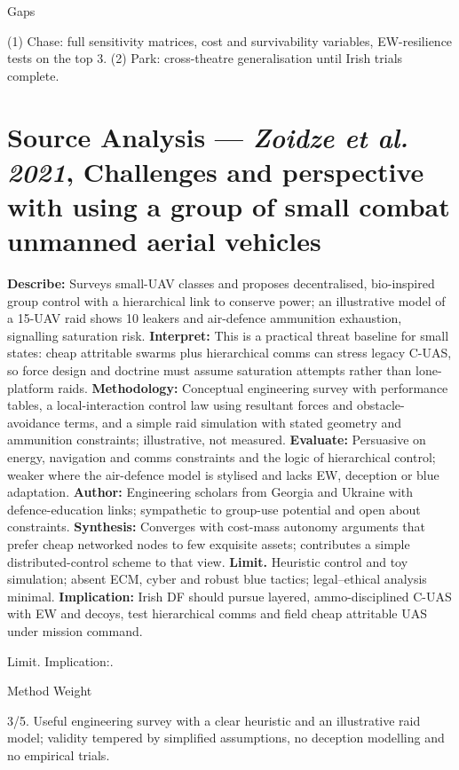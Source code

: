 Gaps

(1) Chase: full sensitivity matrices, cost and survivability variables, EW-resilience tests on the top 3.
(2) Park: cross-theatre generalisation until Irish trials complete.

\parencite{ZOIDZE_2021}

\section*{Source Analysis — \textit{Zoidze et al. 2021}, Challenges and perspective with using a group of small combat unmanned aerial vehicles}
\textbf{Describe:} Surveys small-UAV classes and proposes decentralised, bio-inspired group control with a hierarchical link to conserve power; an illustrative model of a 15-UAV raid shows 10 leakers and air-defence ammunition exhaustion, signalling saturation risk.
\textbf{Interpret:} This is a practical threat baseline for small states: cheap attritable swarms plus hierarchical comms can stress legacy C-UAS, so force design and doctrine must assume saturation attempts rather than lone-platform raids.
\textbf{Methodology:} Conceptual engineering survey with performance tables, a local-interaction control law using resultant forces and obstacle-avoidance terms, and a simple raid simulation with stated geometry and ammunition constraints; illustrative, not measured.
\textbf{Evaluate:} Persuasive on energy, navigation and comms constraints and the logic of hierarchical control; weaker where the air-defence model is stylised and lacks EW, deception or blue adaptation.
\textbf{Author:} Engineering scholars from Georgia and Ukraine with defence-education links; sympathetic to group-use potential and open about constraints.
\textbf{Synthesis:} Converges with cost-mass autonomy arguments that prefer cheap networked nodes to few exquisite assets; contributes a simple distributed-control scheme to that view.
\textbf{Limit.} Heuristic control and toy simulation; absent ECM, cyber and robust blue tactics; legal–ethical analysis minimal.
\textbf{Implication:} Irish DF should pursue layered, ammo-disciplined C-UAS with EW and decoys, test hierarchical comms and field cheap attritable UAS under mission command.

Limit. Implication:.

Method Weight

3/5. Useful engineering survey with a clear heuristic and an illustrative raid model; validity tempered by simplified assumptions, no deception modelling and no empirical trials.

